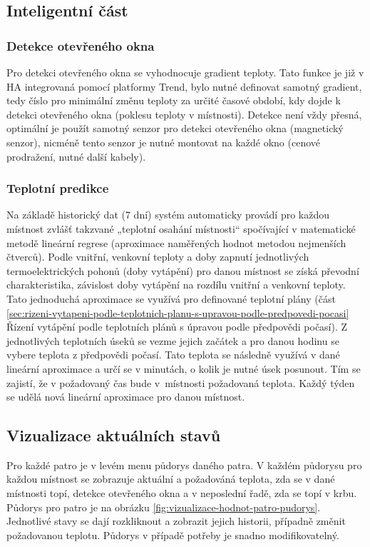 \subsection{Inteligentní část}
\subsubsection{Detekce otevřeného okna}
\label{sec:detekce-otevreneho-okna}
Pro detekci otevřeného okna se vyhodnocuje gradient teploty. Tato funkce je již v HA integrovaná pomocí platformy Trend, bylo nutné definovat samotný gradient, tedy číslo pro minimální změnu teploty za určité časové období, kdy dojde k detekci otevřeného okna (poklesu teploty v místnosti). Detekce není vždy přesná, optimální je použít samotný senzor pro detekci otevřeného okna (magnetický senzor), nicméně tento senzor je nutné montovat na každé okno (cenové prodražení, nutné další kabely).

\subsubsection{Teplotní predikce}
\label{sec:teplotni-predikce}
Na základě historický dat (7 dní) systém automaticky provádí pro každou místnost zvlášť takzvané „teplotní osahání místnosti“ spočívající v matematické metodě lineární regrese (aproximace naměřených hodnot metodou nejmenších čtverců). Podle vnitřní, venkovní teploty a doby zapnutí jednotlivých termoelektrických pohonů (doby vytápění) pro danou místnost se získá převodní charakteristika, závislost doby vytápění na rozdílu vnitřní a venkovní teploty. Tato jednoduchá aproximace se využívá pro definované teplotní plány (část \ref{sec:rizeni-vytapeni-podle-teplotnich-planu-s-upravou-podle-predpovedi-pocasi} Řízení vytápění podle teplotních plánů s úpravou podle předpovědi počasí). Z jednotlivých teplotních úseků se vezme jejich začátek a pro danou hodinu se vybere teplota z předpovědi počasí. Tato teplota se následně využívá v dané lineární aproximace a určí se v minutách, o kolik je nutné úsek posunout. Tím se zajistí, že v požadovaný čas bude v~místnosti požadovaná teplota. Každý týden se udělá nová lineární aproximace pro danou místnost.

\subsection{Vizualizace aktuálních stavů}
Pro každé patro je v levém menu půdorys daného patra. V každém půdorysu pro každou místnost se zobrazuje aktuální a požadováná teplota, zda se v dané místnosti topí, detekce otevřeného okna a v neposlední řadě, zda se topí v krbu. Půdorys pro patro je na obrázku \ref{fig:vizualizace-hodnot-patro-pudorys}. Jednotlivé stavy se dají rozkliknout a zobrazit jejich historii, případně změnit požadovanou teplotu. Půdorys v případě potřeby je snadno modifikovatelný.

